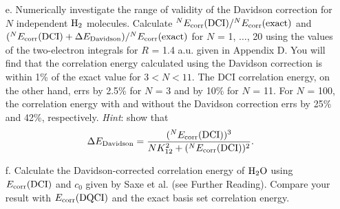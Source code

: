 \documentclass[a4paper]{book}
\newcounter{exercise}[chapter]
\newcommand{\corr}{{\rm corr}}
\begin{document}
\begin{exercise}
\begin{enumerate}
	\item[e.] Numerically investigate the range of validity of the Davidson correction for $N$ independent $\ce{H2}$ molecules. Calculate ${}^N E_\corr( {\rm DCI} )/ {}^N E_\corr( {\rm exact} )$ and $({}^N E_\corr( {\rm DCI} ) + \Delta E_{\rm Davidson} )/ {}^N E_\corr( {\rm exact} )$ for $N$ = 1, $\ldots$, 20 using the values of the two-electron integrals for $R$ = 1.4 a.u. given in Appendix D. You will find that the correlation energy calculated using the Davidson correction is within 1\% of the exact value for $3<N<11$. The DCI correlation energy, on the other hand, errs by 2.5\% for $N$ = 3 and by 10\% for $N$ = 11. For $N$ = 100, the correlation energy with and without the Davidson correction errs by 25\% and 42\%, respectively. {\it Hint}: show that
	\[
		\Delta E_{\rm Davidson} = \frac{ ({}^N E_\corr( {\rm DCI} ))^3 }{ NK^2_{12} + ( {}^N E_\corr( {\rm DCI} ) )^2 }.
	\]
	
	\item[f.] Calculate the Davidson-corrected correlation energy of $\ce{H2O}$ using $E_\corr( {\rm DCI} )$ and $c_0$ given by Saxe et al. (see Further Reading). Compare your result with $E_\corr( {\rm DQCI} )$ and the exact basis set correlation energy.
	\end{enumerate}
	\end{exercise}
	
\end{document}

